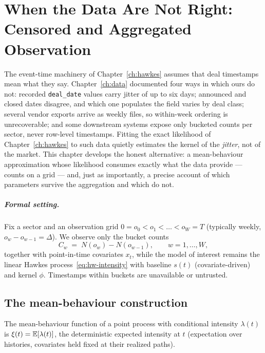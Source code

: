 \chapter{When the Data Are Not Right: Censored and Aggregated Observation}
\label{ch:censored}

The event-time machinery of Chapter~\ref{ch:hawkes} assumes that deal timestamps mean what
they say. Chapter~\ref{ch:data} documented four ways in which ours do not: recorded
\texttt{deal\_date} values carry jitter of up to six days; announced and closed dates
disagree, and which one populates the field varies by deal class; several vendor exports
arrive as weekly files, so within-week ordering is unrecoverable; and some downstream
systems expose only bucketed counts per sector, never row-level timestamps. Fitting the
exact likelihood of Chapter~\ref{ch:hawkes} to such data quietly estimates the kernel
of the \emph{jitter}, not of the market. This chapter develops the honest alternative: a
mean-behaviour approximation whose likelihood consumes exactly what the data provide ---
counts on a grid --- and, just as importantly, a precise account of which parameters
survive the aggregation and which do not.

\paragraph{Formal setting.}
Fix a sector and an observation grid $0 = o_0 < o_1 < \dots < o_W = T$ (typically weekly,
$o_w - o_{w-1} = \Delta$). We observe only the bucket counts
\begin{equation}
\label{eq:cen-counts}
C_w \;=\; N(o_w) - N(o_{w-1}), \qquad w = 1, \dots, W,
\end{equation}
together with point-in-time covariates $x_t$, while the model of interest remains the
linear Hawkes process~\eqref{eq:hw-intensity} with baseline $s(t)$ (covariate-driven) and
kernel $\phi$. Timestamps within buckets are unavailable or untrusted.

\section{The mean-behaviour construction}
\label{sec:cen-mbpp}

\begin{definition}
\label{def:cen-xi}
The mean-behaviour function of a point process with conditional intensity $\lambda(t)$ is
$\xi(t) = \mathbb{E}[\lambda(t)]$, the deterministic expected intensity at $t$ (expectation over
histories, covariates held fixed at their realized paths).
\end{definition}

